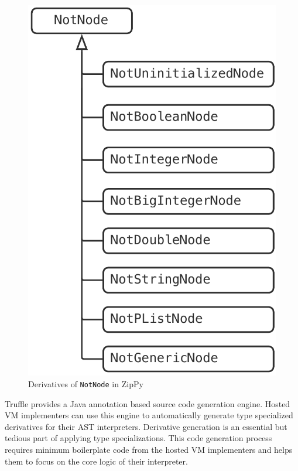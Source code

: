 \begin{figure}[t]
\centering
\includegraphics[scale=.5]{figures/ch3-not-node-derivatives.pdf}
\caption{Derivatives of \texttt{NotNode} in ZipPy}
\label{fig:not-node-derivatives}
\end{figure}

Truffle provides a Java annotation based source code generation engine.
Hosted VM implementers can use this engine to automatically generate type specialized derivatives for their AST interpreters.
Derivative generation is an essential but tedious part of applying type specializations.
This code generation process requires minimum boilerplate code from the hosted VM implementers and helps them to focus on the core logic of their interpreter.

